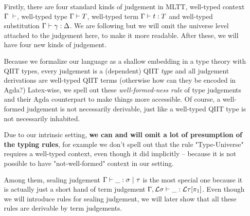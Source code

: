 Firstly, there are four standard kinds of judgement in MLTT, well-typed context $\goodCtx{\Gamma}{l}$, well-typed type $\goodType{\Gamma}{T}{l}$, well-typed term $\goodTerm{\Gamma}{t}{T}$ and well-typed substitution $\goodSub{\Gamma}{\gamma}{\Delta}$. We are following \citep{kaposi2019gluing} but we will omit the universe level attached to the judgement here, to make it more readable. After these, we will have four new kinds of judgement. 

Because we formalize our language as a shallow embedding in a type theory with QIIT types, every judgement is a (dependent) QIIT \textit{type} and all judgement derivations are well-typed QIIT terms (otherwise how can they be encoded in Agda?)
Latex-wise, we spell out these \textit{well-formed-ness rule} of type judgements and their Agda counterpart to make things more accessible. Of course, a well-formed judgement is not necessarily derivable, just like a well-typed QIIT type is not necessarily inhabited. 

Due to our intrinsic setting, \textbf{we can and will omit a lot of presumption of the typing rules}, for example we don't spell out that the rule "Type-Universe" requires a well-typed context, even though it did implicitly -- because it is not possible to have "not-well-formed" context in our setting.

Among them, sealing judgement $\goodSeal{\Gamma}{\_}{\sigma}{\tau}$ is the most special one because it is actually just a short hand of term judgement $\goodTerm{\Gamma , \cL \sigma}{\_}{\cL\tau[\pi_1]}$. Even though we will introduce rules for sealing judgement, we will later show that all these rules are derivable by term judgements.

